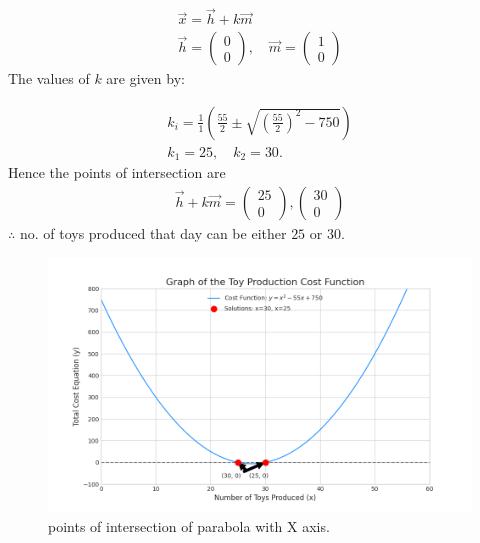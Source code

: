 \documentclass[journal]{IEEEtran}
\begin{document}
\begin{align}
\vec{x} = \vec{h} + k\vec{m}\\
\vec{h} = \begin{pmatrix} 0 \\ 0 \end{pmatrix}, \quad \vec{m} = \begin{pmatrix} 1 \\ 0 \end{pmatrix}
\end{align}
The values of $k$ are given by:

\begin{align}
k_{i} = \frac{1}{1} \left( \frac{55}{2} \pm \sqrt{\left(\frac{55}{2}\right)^2 - 750} \right)\\
k_1 = 25, \quad k_2 = 30.
\end{align}
Hence the points of intersection are
\begin{align}
    \vec{h} + k\vec{m}=\begin{pmatrix} 25 \\ 0 \end{pmatrix},\begin{pmatrix} 30\\ 0 \end{pmatrix}
\end{align}
$\therefore$ no. of toys produced that day can be either $25$ or $30$.

\begin{figure}[H]
    \centering
    \includegraphics[width=0.85\columnwidth]{Figs/graph16.png}
    \caption{points of intersection of parabola with X axis.}
    \label{fig:placeholder}
\end{figure}
\end{document}
